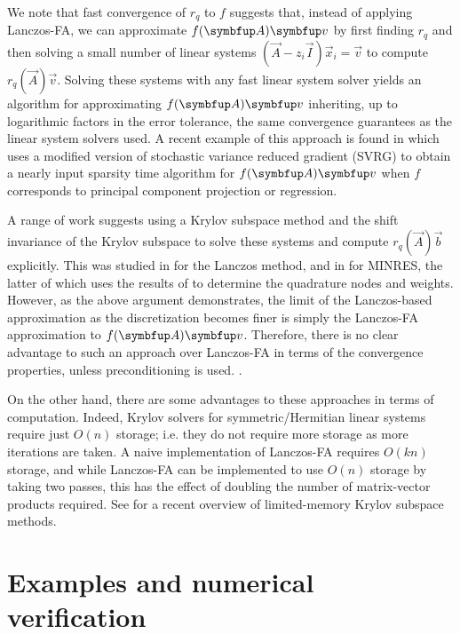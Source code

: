 We note that fast convergence of \( r_q \) to \( f \) suggests that, instead of applying Lanczos-FA, we can approximate \( \fA \vec{v} \) by first finding \( r_q \) and then solving a small number of linear systems \( (\vec{A} - z_i \vec{I}) \vec{x}_i = \vec{v} \) to compute \( r_q(\vec{A})\vec{v} \).
Solving these systems with any fast linear system solver yields an algorithm for approximating \( \fA\vec{v} \) inheriting, up to logarithmic factors in the error tolerance, the same convergence guarantees as the linear system solvers used.
A recent example of this approach is found in \cite{jin_sidford_19} which uses a modified version of stochastic variance reduced gradient (SVRG) to obtain a nearly input sparsity time algorithm for \( \fA\vec{v} \) when \( f \) corresponds to principal component projection or regression.

A range of work suggests using a Krylov subspace method and the shift invariance of the Krylov subspace to solve these systems and compute $r_q(\vec A)\vec b$ explicitly.
This was studied in \cite{frommer_kahl_lippert_rittich_13,frommer_simoncini_09} for the Lanczos method, and in \cite{pleiss_jankowiak_eriksson_damle_gardner_20} for MINRES, the latter of which uses the results of \cite{hale_higham_trefethen_08} to determine the quadrature nodes and weights. 
However, as the above argument demonstrates, the limit of the Lanczos-based approximation as the discretization becomes finer is simply the Lanczos-FA approximation to \( \fA \vec{v} \).
Therefore, there is no clear advantage to such an approach over Lanczos-FA in terms of the convergence properties, unless preconditioning is used.
.

On the other hand, there are some advantages to these approaches in terms of computation.
Indeed, Krylov solvers for symmetric/Hermitian linear systems require just $O(n)$ storage; i.e. they do not require more storage as more iterations are taken. 
A naive implementation of Lanczos-FA requires $O(kn)$ storage, and while Lanczos-FA can be implemented to use \( O(n) \) storage by taking two passes, this has the effect of doubling the number of matrix-vector products required.
See \cite{guttel_schweitzer_21} for a recent overview of limited-memory Krylov subspace methods.


\section{Examples and numerical verification}
\label{sec:cif_examples}

